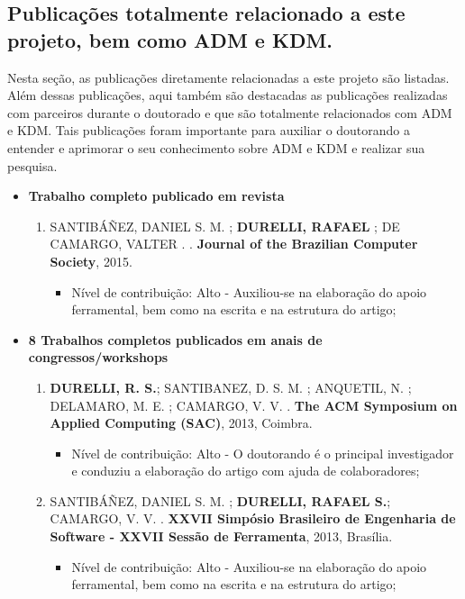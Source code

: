\subsection{Publicações totalmente relacionado a este projeto, bem como ADM e KDM.}

Nesta seção, as publicações diretamente relacionadas a este projeto são listadas. Além dessas publicações, aqui também são destacadas as publicações realizadas com parceiros durante o doutorado e que são totalmente relacionados com ADM e KDM. Tais publicações foram importante para auxiliar o doutorando a entender e aprimorar o seu conhecimento sobre ADM e KDM e realizar sua pesquisa.

\begin{itemize}
	\item \textbf{Trabalho completo publicado em revista}
			
			\begin{enumerate}
			    \item SANTIBÁÑEZ, DANIEL S. M. ; \textbf{DURELLI, RAFAEL} ; DE CAMARGO, VALTER . . \textbf{Journal of the Brazilian Computer Society}, 2015.
			  \begin{itemize}
			        \item Nível de contribuição: Alto - Auxiliou-se na elaboração do apoio ferramental, bem como na escrita e na estrutura do artigo;
			    \end{itemize}
			\end{enumerate}
	\item \textbf{8 Trabalhos completos publicados em anais de congressos/workshops}
	\begin{enumerate}
	 	
	 	\item \textbf{DURELLI, R. S.}; SANTIBANEZ, D. S. M. ; ANQUETIL, N. ; DELAMARO, M. E. ; CAMARGO, V. V. . \textbf{The ACM Symposium on Applied Computing (SAC)}, 2013, Coimbra.
	 	
	 	    \begin{itemize}
			        \item Nível de contribuição: Alto - O doutorando é o principal investigador e conduziu a elaboração do artigo com ajuda de colaboradores;
			    \end{itemize}
		
		\item SANTIBÁÑEZ, DANIEL S. M. ; \textbf{DURELLI, RAFAEL S.}; CAMARGO, V. V. . \textbf{XXVII Simpósio Brasileiro de Engenharia de Software - XXVII Sessão de Ferramenta}, 2013, Brasília.
		    \begin{itemize}
			        \item Nível de contribuição: Alto - Auxiliou-se na elaboração do apoio ferramental, bem como na escrita e na estrutura do artigo;
			    \end{itemize}
		

\end{enumerate}
\end{itemize}
